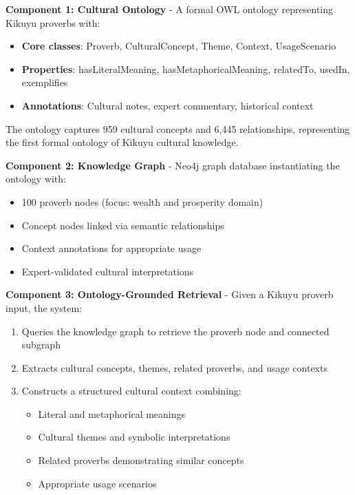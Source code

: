 \documentclass[a4paper,11pt]{article}
\begin{document}
\textbf{Component 1: Cultural Ontology} - A formal OWL ontology representing Kikuyu proverbs with:
\begin{itemize}
    \item \textbf{Core classes}: Proverb, CulturalConcept, Theme, Context, UsageScenario
    \item \textbf{Properties}: hasLiteralMeaning, hasMetaphoricalMeaning, relatedTo, usedIn, exemplifies
    \item \textbf{Annotations}: Cultural notes, expert commentary, historical context
\end{itemize}

The ontology captures 959 cultural concepts and 6,445 relationships, representing the first formal ontology of Kikuyu cultural knowledge.

\textbf{Component 2: Knowledge Graph} - Neo4j graph database instantiating the ontology with:
\begin{itemize}
    \item 100 proverb nodes (focus: wealth and prosperity domain)
    \item Concept nodes linked via semantic relationships
    \item Context annotations for appropriate usage
    \item Expert-validated cultural interpretations
\end{itemize}

\textbf{Component 3: Ontology-Grounded Retrieval} - Given a Kikuyu proverb input, the system:
\begin{enumerate}
    \item Queries the knowledge graph to retrieve the proverb node and connected subgraph
    \item Extracts cultural concepts, themes, related proverbs, and usage contexts
    \item Constructs a structured cultural context combining:
    \begin{itemize}
        \item Literal and metaphorical meanings
        \item Cultural themes and symbolic interpretations
        \item Related proverbs demonstrating similar concepts
        \item Appropriate usage scenarios
    \end{itemize}
\end{enumerate}
\end{document}
